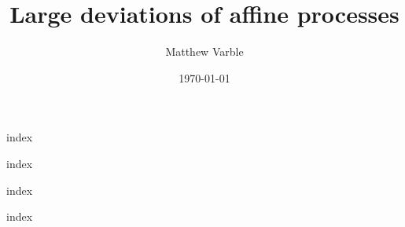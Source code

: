 \documentclass{./preamble/dissertation}
\title{Large deviations of affine processes}
\author{Matthew Varble}
\date{\today}
\begin{document}
\maketitle

\frontmatter
{index}

\tableofcontents

{index}

\mainmatter
{index}

\appendix
{index}

\clearpage

\end{document}
